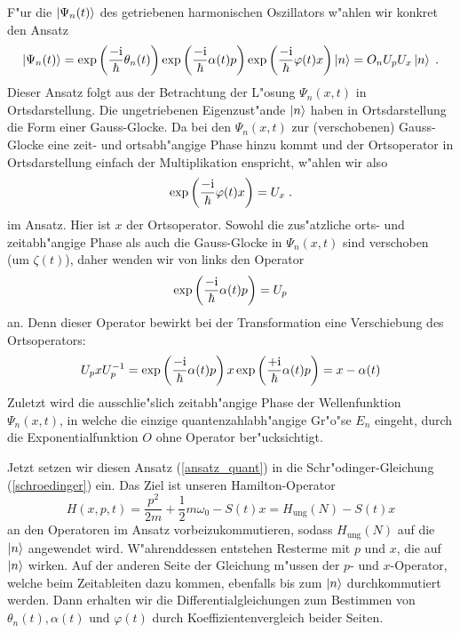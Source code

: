   F"ur die $\ket{\Psi_n(t)}$ des getriebenen harmonischen Oszillators w"ahlen wir konkret den Ansatz
  \begin{equation}
    \ket{\Psi_n(t)}=\exp\left(\frac{-\text i}{\hbar}\theta_n(t)\right)\exp\left(\frac{-\text i}{\hbar}\alpha(t)p\right)\exp\left(\frac{-\text i}{\hbar}\varphi(t)x\right)\ket{n}=O_nU_pU_x\ket{n} \;.
    \label{ansatz_quant}
  \end{equation}
  Dieser Ansatz folgt aus der Betrachtung der L"osung $\Psi_n(x,t)$ in Ortsdarstellung.
  Die ungetriebenen Eigenzust"ande $\ket{n}$ haben in Ortsdarstellung die Form einer Gauss-Glocke.
  Da bei den $\Psi_n(x,t)$ zur (verschobenen) Gauss-Glocke eine zeit- und ortsabh"angige Phase hinzu kommt und der Ortsoperator in Ortsdarstellung einfach der Multiplikation enspricht, w"ahlen wir also
  \begin{equation}
    \exp\left(\frac{-\text i}{\hbar}\varphi(t)x\right)=U_x \; .
  \end{equation}
  im Ansatz.
  Hier ist $x$ der Ortsoperator.
  Sowohl die zus"atzliche orts- und zeitabh"angige Phase als auch die Gauss-Glocke in $\Psi_n(x,t)$ sind verschoben (um $\zeta(t)$), daher wenden wir von links den Operator
  \begin{equation}
    \exp\left(\frac{-\text i}{\hbar}\alpha(t)p\right)=U_p
  \end{equation}
  an.
  Denn dieser Operator bewirkt bei der Transformation eine Verschiebung des Ortsoperators:
  \begin{equation}
    U_pxU_p^{-1}=
    \exp\left(\frac{-\text i}{\hbar}\alpha(t)p\right) x  \exp\left(\frac{+\text i}{\hbar}\alpha(t)p\right)
    =x-\alpha(t)
  \end{equation}
  Zuletzt wird die ausschlie"slich zeitabh"angige Phase der Wellenfunktion $\Psi_n(x,t)$, in welche die einzige quantenzahlabh"angige Gr"o"se $E_n$ eingeht, durch die Exponentialfunktion $O$ ohne Operator ber"ucksichtigt.

  Jetzt setzen wir diesen Ansatz (\ref{ansatz_quant}) in die Schr"odinger-Gleichung (\ref{schroedinger}) ein.
  Das Ziel ist unseren Hamilton-Operator
  \begin{equation}
    H(x,p,t)=\frac{p^2}{2m}+\frac 1 2 m\omega_0 -S(t)x = H_{\text{ung}}(N)-S(t)x
  \end{equation}
  an den Operatoren im Ansatz vorbeizukommutieren, sodass $H_{\text{ung}}(N)$ auf die $\ket{n}$ angewendet wird.
  W"ahrenddessen entstehen Resterme mit $p$ und $x$, die auf $\ket{n}$ wirken.
  Auf der anderen Seite der Gleichung m"ussen der $p$- und $x$-Operator, welche beim Zeitableiten dazu kommen, ebenfalls bis zum $\ket{n}$ durchkommutiert werden.
  Dann erhalten wir die Differentialgleichungen zum Bestimmen von $\theta_n(t), \alpha(t)$ und $\varphi(t)$ durch Koeffizientenvergleich beider Seiten.

